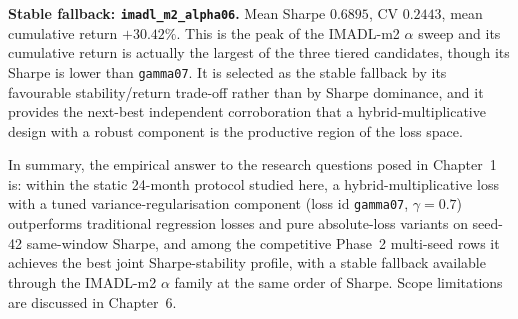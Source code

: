 \textbf{Stable fallback: \texttt{imadl\_m2\_alpha06}.} Mean Sharpe $0.6895$, CV $0.2443$, mean cumulative return $+30.42\%$. This is the peak of the IMADL-m2 $\alpha$ sweep and its cumulative return is actually the largest of the three tiered candidates, though its Sharpe is lower than \texttt{gamma07}. It is selected as the stable fallback by its favourable stability/return trade-off rather than by Sharpe dominance, and it provides the next-best independent corroboration that a hybrid-multiplicative design with a robust component is the productive region of the loss space.

In summary, the empirical answer to the research questions posed in Chapter~1 is: within the static 24-month protocol studied here, a hybrid-multiplicative loss with a tuned variance-regularisation component (loss id \texttt{gamma07}, $\gamma = 0.7$) outperforms traditional regression losses and pure absolute-loss variants on seed-42 same-window Sharpe, and among the competitive Phase~2 multi-seed rows it achieves the best joint Sharpe-stability profile, with a stable fallback available through the IMADL-m2 $\alpha$ family at the same order of Sharpe. Scope limitations are discussed in Chapter~6.
